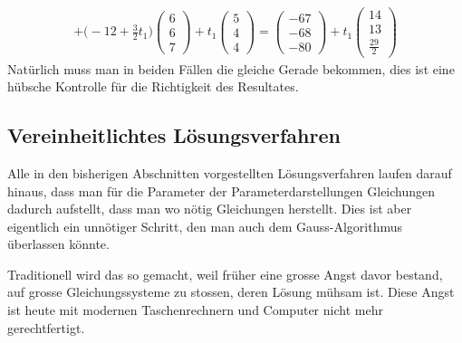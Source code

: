 \begin{beispiel}
\begin{align*}
+\biggl(-12+\frac32t_1\biggr)\begin{pmatrix}6\\6\\7\end{pmatrix}
+t_1\begin{pmatrix}5\\4\\4\end{pmatrix}
=
\begin{pmatrix}-67\\-68\\-80\end{pmatrix}
+t_1
\begin{pmatrix}14\\13\\\frac{29}2\end{pmatrix}
\end{align*}
Natürlich muss man in beiden Fällen die gleiche Gerade bekommen,
dies ist eine hübsche Kontrolle für die Richtigkeit des Resultates.
\end{beispiel}

\subsection{Vereinheitlichtes Lösungsverfahren\label{section-vereinheitlichtes-verfahren}}
Alle in den bisherigen Abschnitten vorgestellten Lösungsverfahren
laufen darauf hinaus, dass man für die Parameter der Parameterdarstellungen
Gleichungen dadurch aufstellt, dass man wo nötig Gleichungen herstellt.
Dies ist aber eigentlich ein unnötiger Schritt, den man auch dem
Gauss-Algorithmus überlassen könnte.

Traditionell wird das so gemacht, weil früher eine grosse Angst
davor bestand, auf grosse Gleichungssysteme zu stossen, deren Lösung
mühsam ist.
Diese Angst ist heute mit modernen Taschenrechnern und
Computer nicht mehr gerechtfertigt.


